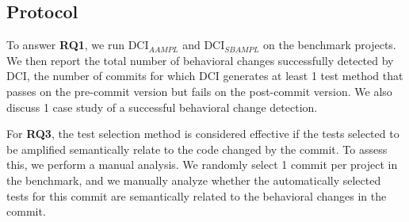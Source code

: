 \subsection{Protocol}
\label{subsec:protocol}


To answer \textbf{RQ1}, we run DCI$_{AAMPL}$ and DCI$_{SBAMPL}$ on the benchmark projects.
We then report the total number of behavioral changes successfully detected by DCI, \ie the number of commits for which DCI generates at least 1 test method that passes on the pre-commit version but fails on the post-commit version.
We also discuss 1 case study of a successful behavioral change detection.





For \textbf{RQ3}, the test selection method is considered effective if the tests selected to be amplified semantically relate to the code changed by the commit. 
To assess this, we perform a manual analysis.%
We randomly select 1 commit per project in the benchmark, and we manually analyze whether the automatically selected tests for this commit are semantically related to the behavioral changes in the commit. 

